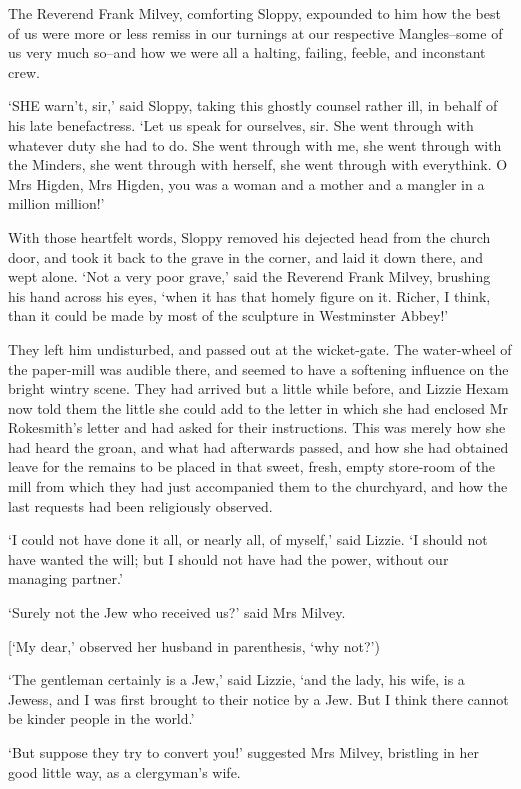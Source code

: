 The Reverend Frank Milvey, comforting Sloppy, expounded to him how the
best of us were more or less remiss in our turnings at our respective
Mangles--some of us very much so--and how we were all a halting,
failing, feeble, and inconstant crew.

‘SHE warn’t, sir,’ said Sloppy, taking this ghostly counsel rather ill,
in behalf of his late benefactress. ‘Let us speak for ourselves, sir.
She went through with whatever duty she had to do. She went through with
me, she went through with the Minders, she went through with herself,
she went through with everythink. O Mrs Higden, Mrs Higden, you was a
woman and a mother and a mangler in a million million!’

With those heartfelt words, Sloppy removed his dejected head from the
church door, and took it back to the grave in the corner, and laid it
down there, and wept alone. ‘Not a very poor grave,’ said the Reverend
Frank Milvey, brushing his hand across his eyes, ‘when it has that
homely figure on it. Richer, I think, than it could be made by most of
the sculpture in Westminster Abbey!’

They left him undisturbed, and passed out at the wicket-gate. The
water-wheel of the paper-mill was audible there, and seemed to have a
softening influence on the bright wintry scene. They had arrived but a
little while before, and Lizzie Hexam now told them the little she could
add to the letter in which she had enclosed Mr Rokesmith’s letter and
had asked for their instructions. This was merely how she had heard the
groan, and what had afterwards passed, and how she had obtained leave
for the remains to be placed in that sweet, fresh, empty store-room of
the mill from which they had just accompanied them to the churchyard,
and how the last requests had been religiously observed.

‘I could not have done it all, or nearly all, of myself,’ said Lizzie.
‘I should not have wanted the will; but I should not have had the power,
without our managing partner.’

‘Surely not the Jew who received us?’ said Mrs Milvey.

[‘My dear,’ observed her husband in parenthesis, ‘why not?’)

‘The gentleman certainly is a Jew,’ said Lizzie, ‘and the lady, his
wife, is a Jewess, and I was first brought to their notice by a Jew. But
I think there cannot be kinder people in the world.’

‘But suppose they try to convert you!’ suggested Mrs Milvey, bristling
in her good little way, as a clergyman’s wife.

